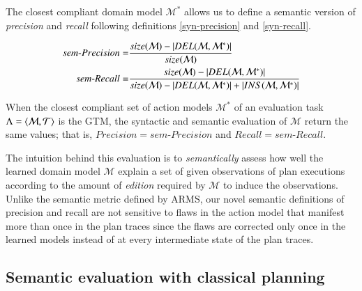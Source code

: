 The closest compliant domain model $\mathcal{M^*}$ allows us to define a semantic version of {\em precision} and {\em recall} following definitions \ref{syn-precision} and \ref{syn-recall}.


\begin{small}
	\begin{align*}
	sem\text{-}Precision=&\frac{size(\mathcal{M})- \left|DEL(\mathcal{M},\mathcal{M^*})\right|}{size(\mathcal{M})}\\
    \vspace{0.5cm}
	sem\text{-}Recall=&\frac{size(\mathcal{M})- \left|DEL(\mathcal{M},\mathcal{M^*})\right|}{size(\mathcal{M}) - \left|DEL(\mathcal{M},\mathcal{M^*})\right| + \left|INS(\mathcal{M},\mathcal{M^*})\right|}
	\end{align*}
\end{small}


\begin{myproposition}
When the closest compliant set of action models $\mathcal{M^*}$ of an evaluation task $\Lambda = {\langle \mathcal{M}, \mathcal{T} \rangle}$ is the GTM, the syntactic and semantic evaluation of $\mathcal{M}$ return the same values; that is, $Precision=sem\text{-}Precision$ and $Recall=sem\text{-}Recall$.
\end{myproposition}


The intuition behind this evaluation is to {\em semantically} assess how well the learned domain model $\mathcal{M}$ explain a set of given observations of plan executions according to the amount of {\em edition} required by $\mathcal{M}$ to induce the observations. Unlike the semantic metric defined by ARMS, our novel semantic definitions of precision and recall are not sensitive to flaws in the action model that manifest more than once in the plan traces since the flaws are corrected only once in the learned models instead of at every intermediate state of the plan traces.



\subsection{Semantic evaluation with classical planning}
\label{edit_distance}


